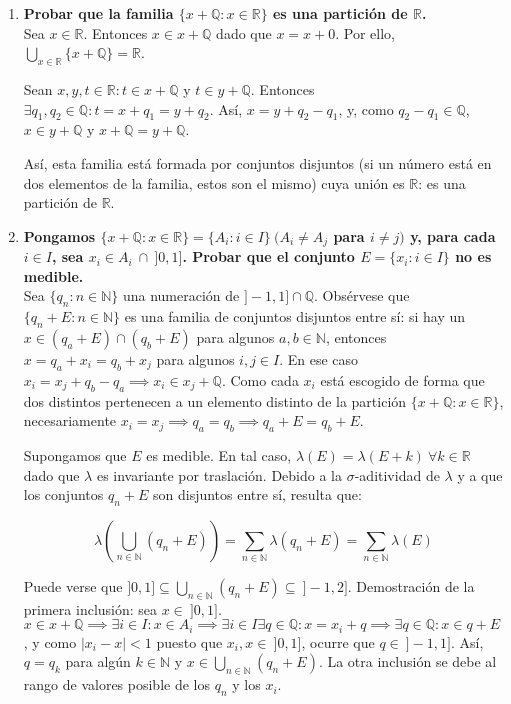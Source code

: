 
\begin{enumerate}[label=\alph*)]
	\item \textbf{Probar que la familia $\{x + \mathbb Q : x \in \mathbb R \}$ es una partición de $\mathbb R$.} \\
	
	Sea $x \in \mathbb R$. Entonces $x \in x+\mathbb Q$ dado que $x = x + 0$. Por ello, $\displaystyle \bigcup_{x \in \mathbb R} \{x+\mathbb Q\} = \mathbb R$.
	
	Sean $x,y,t \in \mathbb R : t \in x+\mathbb Q$ y $t \in y + \mathbb Q$. Entonces $\exists q_1, q_2 \in \mathbb Q : t = x + q_1 = y + q_2$. Así, $x = y + q_2 - q_1$, y, como $q_2 - q_1 \in \mathbb Q$, $x \in y + \mathbb Q$ y $x + \mathbb Q = y + \mathbb Q$.
	
	Así, esta familia está formada por conjuntos disjuntos (si un número está en dos elementos de la familia, estos son el mismo) cuya unión es $\mathbb R$: es una partición de $\mathbb R$.
	
	\item \textbf{Pongamos $\{x+\mathbb Q : x \in \mathbb R\} = \{A_i : i \in I\} \ (A_i \ne A_j$ para $i \ne j)$ y, para cada $i \in I$, sea $x_i \in A_i \ \cap \ ]0, 1]$. Probar que el conjunto $E = \{x_i : i \in I\}$ no es medible.} \\
	
	Sea $\{q_n : n \in \mathbb N\}$ una numeración de $]-1, 1] \cap \mathbb Q$. Obsérvese que $\{q_n + E : n \in \mathbb N\}$ es una familia de conjuntos disjuntos entre sí: si hay un $x \in (q_a + E) \cap (q_b + E)$ para algunos $a, b \in \mathbb N$, entonces $x = q_a + x_i = q_b + x_j$ para algunos $i,j \in I$. En ese caso $x_i = x_j + q_b - q_a \implies x_i \in x_j + \mathbb Q$. Como cada $x_i$ está escogido de forma que dos distintos pertenecen a un elemento distinto de la partición $\{x + \mathbb Q : x \in \mathbb R\}$, necesariamente $x_i = x_j \implies q_a = q_b \implies q_a + E = q_b + E$.
	
	Supongamos que $E$ es medible. En tal caso, $\lambda(E) = \lambda(E+k) \ \forall k \in \mathbb R$ dado que $\lambda$ es invariante por traslación. Debido a la $\sigma$-aditividad de $\lambda$ y a que los conjuntos $q_n + E$ son disjuntos entre sí, resulta que:
	
	$$\lambda(\bigcup_{n \in \mathbb N} (q_n + E)) = \sum_{n \in \mathbb N}\lambda(q_n + E) = \sum_{n \in \mathbb N} \lambda(E)$$
	
	Puede verse que $\displaystyle ]0, 1] \subseteq \bigcup_{n \in \mathbb N} (q_n + E) \subseteq \ ]-1, 2]$. Demostración de la primera inclusión: sea $x \in \ ]0, 1]$. $x \in x + \mathbb Q \implies \exists i \in I : x \in A_i \implies \exists i \in I \exists q \in \mathbb Q : x = x_i + q \implies \exists q \in \mathbb Q : x \in q + E$, y como $|x_i-x| < 1$ puesto que $x_i, x \in \ ]0,1]$, ocurre que $q \in \ ]-1,1]$. Así, $q = q_k$ para algún $k \in \mathbb N$ y $\displaystyle x \in \bigcup_{n \in \mathbb N} (q_n + E)$. La otra inclusión se debe al rango de valores posible de los $q_n$ y los $x_i$.
	

\end{enumerate}
